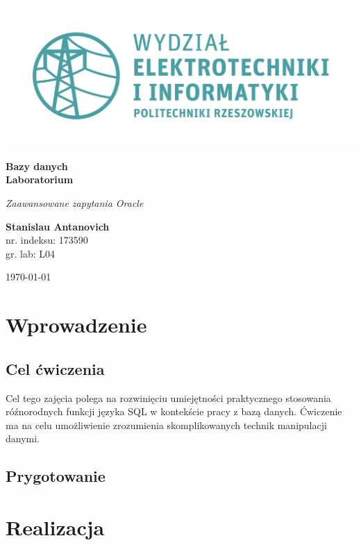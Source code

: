 \documentclass[a4paper, 10pt]{article}
\begin{document}
\begin{titlepage}
\begin{center}
	\includegraphics[scale=0.7]{logo.png}

	\vspace*{4cm}
	\textbf{Bazy danych\\ Laboratorium}

	\vspace{1.5cm}
	\textit{Zaawansowane zapytania Oracle}

	\vspace{1.5cm}
	\textbf{Stanislau Antanovich}\\
	nr. indeksu: 173590\\
	gr. lab: L04

	\vspace{4.5cm}
	\today
\end{center}
\end{titlepage}

\tableofcontents
\listoffigures
\lstlistoflistings

\newpage

\section{Wprowadzenie}
\subsection{Cel ćwiczenia}

Cel tego zajęcia polega na rozwinięciu umiejętności praktycznego stosowania róźnorodnych funkcji języka SQL w kontekście pracy z bazą danych. 
Ćwiczenie ma na celu umożliwienie zrozumienia skomplikowanych technik manipulacji danymi.
\subsection{Prygotowanie}

\section{Realizacja}
\end{document}
